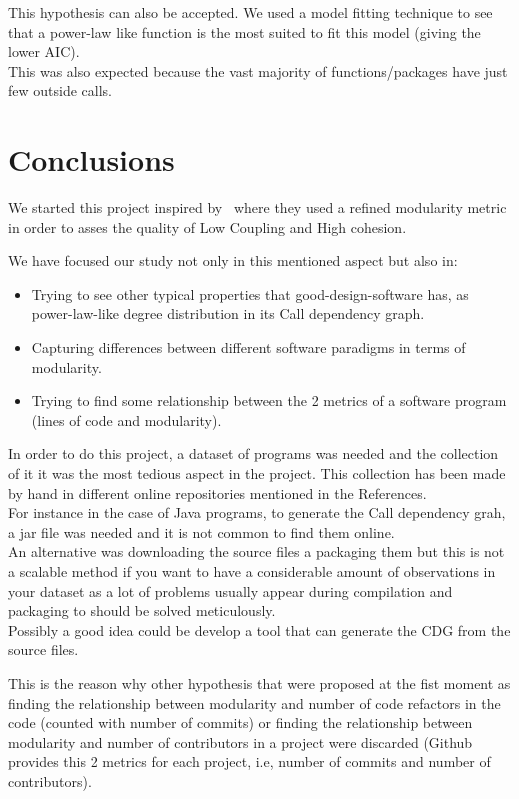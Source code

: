 \documentclass[12pt, a4paper]{article}
\begin{document}
This hypothesis can also be accepted. We used a model fitting technique to see that a power-law like function is the most suited to fit this model (giving the lower AIC).  \\

This was also expected because the vast majority of functions/packages have just few outside calls.



\section{Conclusions}

We started this project inspired by~\cite{cohesion_coupling} where they used a refined modularity metric in order to asses the quality of Low Coupling and High cohesion.

We have focused our study not only in this mentioned aspect but also in:

\begin{itemize}
  \item Trying to see other typical properties that good-design-software has, as power-law-like degree distribution in its Call dependency graph.
  \item Capturing differences between different software paradigms in terms of modularity.
  \item Trying to find some relationship between the 2 metrics of a software program (lines of code and modularity).
\end{itemize}

In order to do this project, a dataset of programs was needed and the collection of it it was the most tedious aspect in the project. This collection has been made by hand in different online repositories mentioned in the References. \\
For instance in the case of Java programs, to generate the Call dependency grah, a jar file was needed and it is not common to find them online.\\ An alternative was downloading the source files a packaging them but this is not a scalable method if you want to have a considerable amount of observations in your dataset as a lot of problems usually appear during compilation and packaging to should be solved meticulously. \\ Possibly a good idea could be develop a tool that can generate the CDG from the source files.

This is the reason why other hypothesis that were proposed at the fist moment as finding the relationship between modularity and number of code refactors in the code (counted with number of commits) or finding the relationship between modularity and number of contributors in a project were discarded (Github provides this 2 metrics for each project, i.e, number of commits and number of contributors).
\newpage
\end{document}
